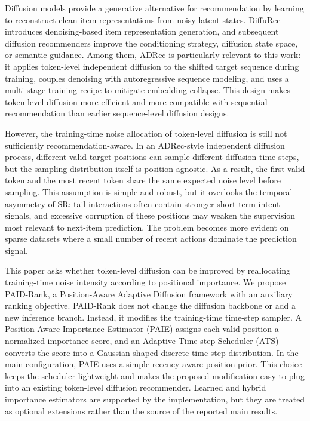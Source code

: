 \documentclass[runningheads,a4paper]{llncs}
\begin{document}
Diffusion models provide a generative alternative for recommendation by learning to reconstruct clean item representations from noisy latent states. DiffuRec introduces denoising-based item representation generation, and subsequent diffusion recommenders improve the conditioning strategy, diffusion state space, or semantic guidance. Among them, ADRec is particularly relevant to this work: it applies token-level independent diffusion to the shifted target sequence during training, couples denoising with autoregressive sequence modeling, and uses a multi-stage training recipe to mitigate embedding collapse. This design makes token-level diffusion more efficient and more compatible with sequential recommendation than earlier sequence-level diffusion designs.

However, the training-time noise allocation of token-level diffusion is still not sufficiently recommendation-aware. In an ADRec-style independent diffusion process, different valid target positions can sample different diffusion time steps, but the sampling distribution itself is position-agnostic. As a result, the first valid token and the most recent token share the same expected noise level before sampling. This assumption is simple and robust, but it overlooks the temporal asymmetry of SR: tail interactions often contain stronger short-term intent signals, and excessive corruption of these positions may weaken the supervision most relevant to next-item prediction. The problem becomes more evident on sparse datasets where a small number of recent actions dominate the prediction signal.

This paper asks whether token-level diffusion can be improved by reallocating training-time noise intensity according to positional importance. We propose PAID-Rank, a Position-Aware Adaptive Diffusion framework with an auxiliary ranking objective. PAID-Rank does not change the diffusion backbone or add a new inference branch. Instead, it modifies the training-time time-step sampler. A Position-Aware Importance Estimator (PAIE) assigns each valid position a normalized importance score, and an Adaptive Time-step Scheduler (ATS) converts the score into a Gaussian-shaped discrete time-step distribution. In the main configuration, PAIE uses a simple recency-aware position prior. This choice keeps the scheduler lightweight and makes the proposed modification easy to plug into an existing token-level diffusion recommender. Learned and hybrid importance estimators are supported by the implementation, but they are treated as optional extensions rather than the source of the reported main results.
\end{document}
